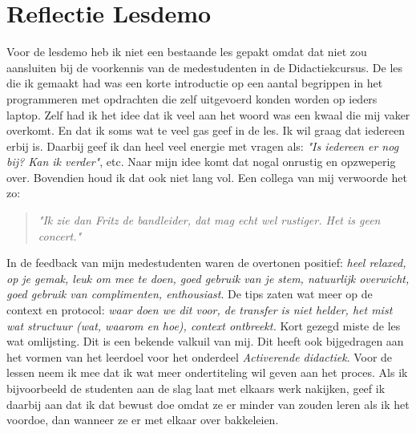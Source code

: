\section{Reflectie Lesdemo}
\label{sec:lesdemo}
Voor de lesdemo heb ik niet een bestaande les gepakt omdat dat niet zou aansluiten bij de voorkennis van de medestudenten in de Didactiekcursus. De les die ik gemaakt had was een korte introductie op een aantal begrippen in het programmeren met opdrachten die zelf uitgevoerd konden worden op ieders laptop. Zelf had ik het idee dat ik veel aan het woord was een kwaal die mij vaker overkomt. En dat ik soms wat te veel gas geef in de les. Ik wil graag dat iedereen erbij is. Daarbij geef ik dan heel veel energie met vragen als: \textit{"Is iedereen er nog bij? Kan ik verder"}, etc. Naar mijn idee komt dat nogal onrustig en opzweperig over. Bovendien houd ik dat ook niet lang vol. Een collega van mij verwoorde het zo:
\begin{quotation}
  \textit{"Ik zie dan Fritz de bandleider, dat mag echt wel rustiger. Het is geen concert."}
\end{quotation}
In de feedback van mijn medestudenten waren de overtonen positief: \textit{heel relaxed, op je gemak, leuk om mee te doen, goed gebruik van je stem, natuurlijk overwicht, goed gebruik van complimenten, enthousiast}. De tips zaten wat meer op de context en protocol: \textit{waar doen we dit voor, de transfer is niet helder, het mist wat structuur (wat, waarom en hoe), context ontbreekt.}
Kort gezegd miste de les wat omlijsting. Dit is een bekende valkuil van mij. Dit heeft ook bijgedragen aan het vormen van het leerdoel voor het onderdeel \textit{Activerende didactiek}. Voor de lessen neem ik mee dat ik wat meer ondertiteling wil geven aan het proces. Als ik bijvoorbeeld de studenten aan de slag laat met elkaars werk nakijken, geef ik daarbij aan dat ik dat bewust doe omdat ze er minder van zouden leren als ik het voordoe, dan wanneer ze er met elkaar over bakkeleien.

